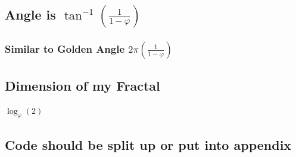 \documentclass[11pt]{article}
\begin{document}
\subsection{Angle is \(\tan^{-1}\left( \frac{1}{1-\varphi}\right)\)}
\label{sec:orgfd164c2}
\subsubsection{Similar to Golden Angle \(2 \pi \left( \frac{1}{1-\varphi}\right)\)}
\label{sec:org345967f}
\subsection{Dimension of my Fractal}
\label{sec:orgeb352d2}
\(\log_{\varphi}(2)\)
\subsection{Code should be split up or put into appendix}
\label{sec:org0812b9b}
\end{document}
